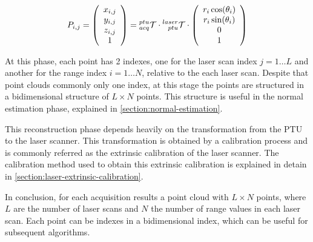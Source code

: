 \begin{equation}\label{eqn:point-registration}
    P_{i,j} = 
    \left(
        \begin{array}{c}
            x_{i,j} \\ y_{i,j} \\ z_{i,j} \\ 1 \\
        \end{array}    
    \right)
    =
    \TF{acq}{ptu}
    \cdot \TF{ptu}{laser}
    \cdot
    \left(
        \begin{array}{c}
            r_i \cos(\theta_i) \\
            r_i \sin(\theta_i) \\
            0 \\
            1 \\
        \end{array}    
    \right)
\end{equation}

At this phase, each point has 2 indexes, one for the laser scan index $j=1\dots L$ and another for the range index $i=1\dots N$, relative to the each laser scan. Despite that point clouds commonly only one index, at this stage the points are structured in a bidimensional structure of $L \times N$ points. This structure is useful in the normal estimation phase, explained in \cref{section:normal-estimation}.

This reconstruction phase depends heavily on the transformation from the PTU to the laser scanner. This transformation is obtained by a calibration process and is commonly referred as the extrinsic calibration of the laser scanner. The calibration method used to obtain this extrinsic calibration is explained in detain in \cref{section:laser-extrinsic-calibration}.

In conclusion, for each acquisition results a point cloud with $L \times N$ points, where $L$ are the number of laser scans and $N$ the number of range values in each laser scan. Each point can be indexes in a bidimensional index, which can be useful for subsequent algorithms.
